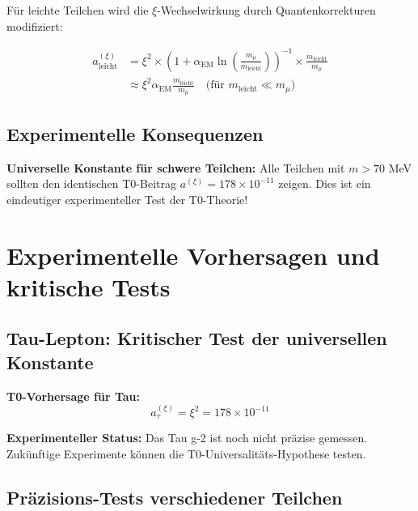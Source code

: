\documentclass[12pt,a4paper]{article}
\newcommand{\xipar}{\xi}
\newcommand{\alphaEM}{\alpha_{\text{EM}}}
\begin{document}
	Für leichte Teilchen wird die $\xipar$-Wechselwirkung durch Quantenkorrekturen modifiziert:
	
	\begin{align}
		a_{\text{leicht}}^{(\xipar)} &= \xipar^2 \times \left(1 + \alphaEM \ln\left(\frac{m_\mu}{m_{\text{leicht}}}\right)\right)^{-1} \times \frac{m_{\text{leicht}}}{m_\mu} \\
		&\approx \xipar^2 \alphaEM \frac{m_{\text{leicht}}}{m_\mu} \quad \text{(für } m_{\text{leicht}} \ll m_\mu\text{)}
	\end{align}
	
	\subsection{Experimentelle Konsequenzen}
	
	\begin{wichtig}
		\textbf{Universelle Konstante für schwere Teilchen:} Alle Teilchen mit $m > 70$ MeV sollten den identischen T0-Beitrag $a^{(\xipar)} = 178 \times 10^{-11}$ zeigen. Dies ist ein eindeutiger experimenteller Test der T0-Theorie!
	\end{wichtig}
	
	\section{Experimentelle Vorhersagen und kritische Tests}
	
	\subsection{Tau-Lepton: Kritischer Test der universellen Konstante}
	
	\begin{formel}
		\textbf{T0-Vorhersage für Tau:}
		\begin{equation}
			a_\tau^{(\xipar)} = \xipar^2 = 178 \times 10^{-11}
		\end{equation}
	\end{formel}
	
	\textbf{Experimenteller Status:} Das Tau g-2 ist noch nicht präzise gemessen. Zukünftige Experimente können die T0-Universalitäts-Hypothese testen.
	
	\subsection{Präzisions-Tests verschiedener Teilchen}
	
\end{document}
